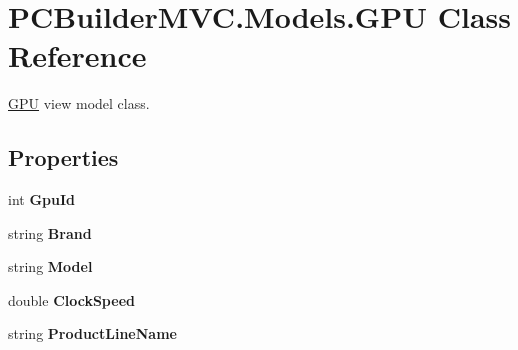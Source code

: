 \hypertarget{class_p_c_builder_m_v_c_1_1_models_1_1_g_p_u}{}\section{P\+C\+Builder\+M\+V\+C.\+Models.\+G\+PU Class Reference}
\label{class_p_c_builder_m_v_c_1_1_models_1_1_g_p_u}


\hyperlink{class_p_c_builder_m_v_c_1_1_models_1_1_g_p_u}{G\+PU} view model class.  


\subsection*{Properties}
\begin{DoxyCompactItemize}
\item 
int {\bfseries Gpu\+Id}\hypertarget{class_p_c_builder_m_v_c_1_1_models_1_1_g_p_u_a94f2a1bac2d93ecbbeb724da3a08755b}{}\label{class_p_c_builder_m_v_c_1_1_models_1_1_g_p_u_a94f2a1bac2d93ecbbeb724da3a08755b}

\item 
string {\bfseries Brand}\hypertarget{class_p_c_builder_m_v_c_1_1_models_1_1_g_p_u_a8afab1e0fe83bfe730cffbe144d11a09}{}\label{class_p_c_builder_m_v_c_1_1_models_1_1_g_p_u_a8afab1e0fe83bfe730cffbe144d11a09}

\item 
string {\bfseries Model}\hypertarget{class_p_c_builder_m_v_c_1_1_models_1_1_g_p_u_a315da092d9c9524158f89139ce027152}{}\label{class_p_c_builder_m_v_c_1_1_models_1_1_g_p_u_a315da092d9c9524158f89139ce027152}

\item 
double {\bfseries Clock\+Speed}\hypertarget{class_p_c_builder_m_v_c_1_1_models_1_1_g_p_u_acfe3c728a749c0433530e2667ab2fdd4}{}\label{class_p_c_builder_m_v_c_1_1_models_1_1_g_p_u_acfe3c728a749c0433530e2667ab2fdd4}

\item 
string {\bfseries Product\+Line\+Name}\hypertarget{class_p_c_builder_m_v_c_1_1_models_1_1_g_p_u_a8d5a1828631eda6bef943c87646564fd}{}\label{class_p_c_builder_m_v_c_1_1_models_1_1_g_p_u_a8d5a1828631eda6bef943c87646564fd}


\end{DoxyCompactItemize}
